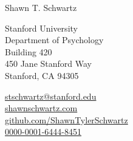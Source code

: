 {\huge Shawn T. Schwartz} %
\bigskip\medskip

Stanford University\\
Department of Psychology\\
Building 420\\
450 Jane Stanford Way\\
Stanford, CA 94305

\medskip %

 \href{mailto:stschwartz@stanford.edu}{stschwartz@stanford.edu} \\
 \href{https://shawnschwartz.com}{shawnschwartz.com} \\
 \href{https://github.com/ShawnTylerSchwartz}{github.com/ShawnTylerSchwartz} \\
 \href{https://orcid.org/0000-0001-6444-8451}{0000-0001-6444-8451}
